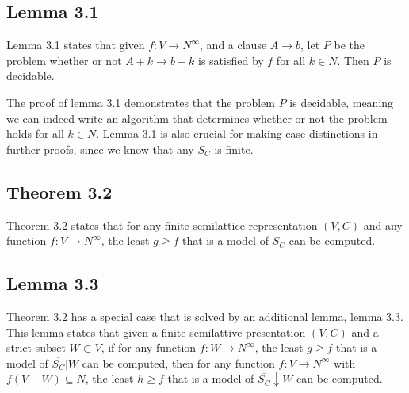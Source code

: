 \subsection{Lemma 3.1}

Lemma 3.1 states that given $f : V \rightarrow N^{\infty}$,
and a clause $A \rightarrow b$, let $P$ be the problem whether or not
$A + k \rightarrow b + k$ is satisfied by $f$ for all $k \in N$.
Then $P$ is decidable. \cite[p.~3]{mbezem}

The proof of lemma 3.1 demonstrates that the problem $P$
is decidable, meaning we can indeed write an algorithm that
determines whether or not the problem holds for all $k \in N$.
Lemma 3.1 is also crucial for making case distinctions
in further proofs, since we know that any $S_C$ is finite.

\subsection{Theorem 3.2}

Theorem 3.2 states that for any finite semilattice representation
$(V, C)$ and any function $f : V \rightarrow N^{\infty}$,
the least $g \ge f$ that is a model of $\overline{S_C}$ can be computed.
\cite[p.~3]{mbezem}

\subsection{Lemma 3.3}

Theorem 3.2 has a special case that is solved by an additional lemma,
lemma 3.3. This lemma states that given a finite semilattive presentation
$(V, C)$ and a strict subset $W \subset V$, if for any function
$f : W \rightarrow N^{\infty}$, the least $g \ge f$ that is a model of
$\overline{S_C}|W$ can be computed, then for any function
$f : V \rightarrow N^{\infty}$ with $f(V - W) \subseteq N$,
the least $h \ge f$ that is a model of $\overline{S_C}\downarrow W$ can be computed.
\cite[p.~3-4]{mbezem}
